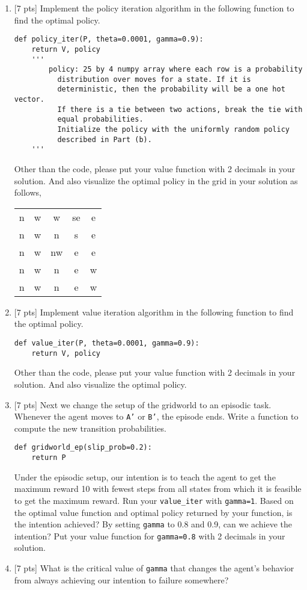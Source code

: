 \begin{enumerate}
    \item{}[7 pts] Implement the policy iteration algorithm in the following
    function to find the optimal policy.
    \begin{verbatim}
def policy_iter(P, theta=0.0001, gamma=0.9):
    return V, policy
    '''
        policy: 25 by 4 numpy array where each row is a probability
          distribution over moves for a state. If it is
          deterministic, then the probability will be a one hot vector.
          If there is a tie between two actions, break the tie with
          equal probabilities.
          Initialize the policy with the uniformly random policy
          described in Part (b).
    '''
    \end{verbatim}
    Other than the code, please put your value function with 2 decimals
    in your solution. And also visualize the optimal policy in
    the grid in your solution as follows,
    \begin{tabular}{ccccc}
      n & w & w & se & e \\
      n & w & n & s & e \\
      n & w & nw & e & e \\
      n & w & n & e & w \\
      n & w & n & e & w \\
    \end{tabular}

    \item{}[7 pts] Implement value iteration algorithm in the following
    function to find the optimal policy.
    \begin{verbatim}
def value_iter(P, theta=0.0001, gamma=0.9):
    return V, policy
    \end{verbatim}
    Other than the code, please put your value function with 2 decimals
    in your solution. And also visualize the optimal policy.

    \item{}[7 pts] Next we change the setup of the gridworld to an episodic task.
    Whenever the agent moves to \texttt{A'} or \texttt{B'}, the episode ends.
    Write a function to compute the new transition probabilities.
    \begin{verbatim}
def gridworld_ep(slip_prob=0.2):
    return P
    \end{verbatim}
    Under the episodic setup, our intention is to teach the agent to get the
    maximum reward 10 with fewest steps from all states from which it is
    feasible to get the maximum reward. Run your \texttt{value\_iter} with
    \texttt{gamma=1}. Based on the optimal value function and optimal policy returned by your
    function, is the intention achieved?
    By setting \texttt{gamma} to 0.8 and 0.9, can we achieve the intention?
    Put your value function for \texttt{gamma=0.8} with 2 decimals in your
    solution.

    \item{}[7 pts] What is the critical value of \texttt{gamma} that changes the agent's
    behavior from always achieving our intention to failure somewhere?
\end{enumerate}
